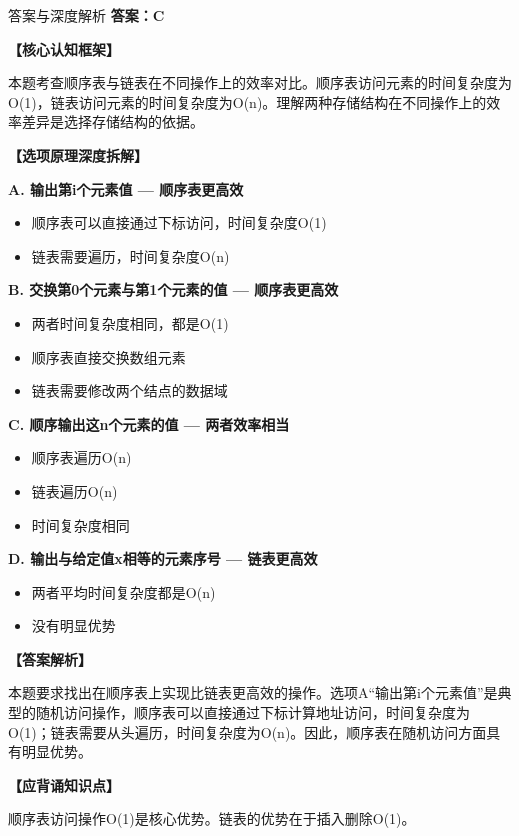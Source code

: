 \documentclass[12pt, a4paper]{article}
\newenvironment{bluebox}{\begin{framed}\begin{minipage}{\linewidth}}{\end{minipage}\end{framed}}
\begin{document}
\begin{bluebox}{答案与深度解析}
	\textbf{答案：C}

	\textbf{【核心认知框架】}

	本题考查顺序表与链表在不同操作上的效率对比。顺序表访问元素的时间复杂度为O(1)，链表访问元素的时间复杂度为O(n)。理解两种存储结构在不同操作上的效率差异是选择存储结构的依据。

	\textbf{【选项原理深度拆解】}

	\item \textbf{A. 输出第i个元素值 — 顺序表更高效}
	\begin{itemize}
		\item 顺序表可以直接通过下标访问，时间复杂度O(1)
		\item 链表需要遍历，时间复杂度O(n)
	\end{itemize}

	\item \textbf{B. 交换第0个元素与第1个元素的值 — 顺序表更高效}
	\begin{itemize}
		\item 两者时间复杂度相同，都是O(1)
		\item 顺序表直接交换数组元素
		\item 链表需要修改两个结点的数据域
	\end{itemize}

	\item \textbf{C. 顺序输出这n个元素的值 — 两者效率相当}
	\begin{itemize}
		\item 顺序表遍历O(n)
		\item 链表遍历O(n)
		\item 时间复杂度相同
	\end{itemize}

	\item \textbf{D. 输出与给定值x相等的元素序号 — 链表更高效}
	\begin{itemize}
		\item 两者平均时间复杂度都是O(n)
		\item 没有明显优势
	\end{itemize}

	\textbf{【答案解析】}

	本题要求找出在顺序表上实现比链表更高效的操作。选项A“输出第i个元素值”是典型的随机访问操作，顺序表可以直接通过下标计算地址访问，时间复杂度为O(1)；链表需要从头遍历，时间复杂度为O(n)。因此，顺序表在随机访问方面具有明显优势。

	\textbf{【应背诵知识点】}

	顺序表访问操作O(1)是核心优势。链表的优势在于插入删除O(1)。
\end{bluebox}
\end{document}
